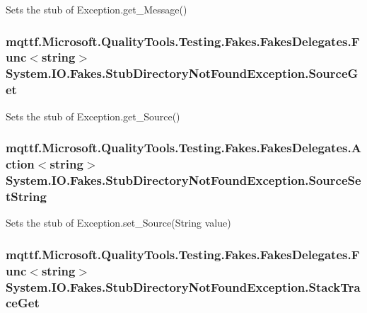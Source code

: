 Sets the stub of Exception.\-get\-\_\-\-Message()

\hypertarget{class_system_1_1_i_o_1_1_fakes_1_1_stub_directory_not_found_exception_ae933c1c75bcd05f38ed427c119daa2c8}{
\subsubsection[{Source\-Get}]{\setlength{\rightskip}{0pt plus 5cm}mqttf.\-Microsoft.\-Quality\-Tools.\-Testing.\-Fakes.\-Fakes\-Delegates.\-Func$<$string$>$ System.\-I\-O.\-Fakes.\-Stub\-Directory\-Not\-Found\-Exception.\-Source\-Get}}\label{class_system_1_1_i_o_1_1_fakes_1_1_stub_directory_not_found_exception_ae933c1c75bcd05f38ed427c119daa2c8}


Sets the stub of Exception.\-get\-\_\-\-Source()

\hypertarget{class_system_1_1_i_o_1_1_fakes_1_1_stub_directory_not_found_exception_a290e1e8f2958b2011801c295e35e4f89}{
\subsubsection[{Source\-Set\-String}]{\setlength{\rightskip}{0pt plus 5cm}mqttf.\-Microsoft.\-Quality\-Tools.\-Testing.\-Fakes.\-Fakes\-Delegates.\-Action$<$string$>$ System.\-I\-O.\-Fakes.\-Stub\-Directory\-Not\-Found\-Exception.\-Source\-Set\-String}}\label{class_system_1_1_i_o_1_1_fakes_1_1_stub_directory_not_found_exception_a290e1e8f2958b2011801c295e35e4f89}


Sets the stub of Exception.\-set\-\_\-\-Source(\-String value)

\hypertarget{class_system_1_1_i_o_1_1_fakes_1_1_stub_directory_not_found_exception_ac4ce57698cd24e67201aec0352bf21f2}{
\subsubsection[{Stack\-Trace\-Get}]{\setlength{\rightskip}{0pt plus 5cm}mqttf.\-Microsoft.\-Quality\-Tools.\-Testing.\-Fakes.\-Fakes\-Delegates.\-Func$<$string$>$ System.\-I\-O.\-Fakes.\-Stub\-Directory\-Not\-Found\-Exception.\-Stack\-Trace\-Get}}\label{class_system_1_1_i_o_1_1_fakes_1_1_stub_directory_not_found_exception_ac4ce57698cd24e67201aec0352bf21f2}


